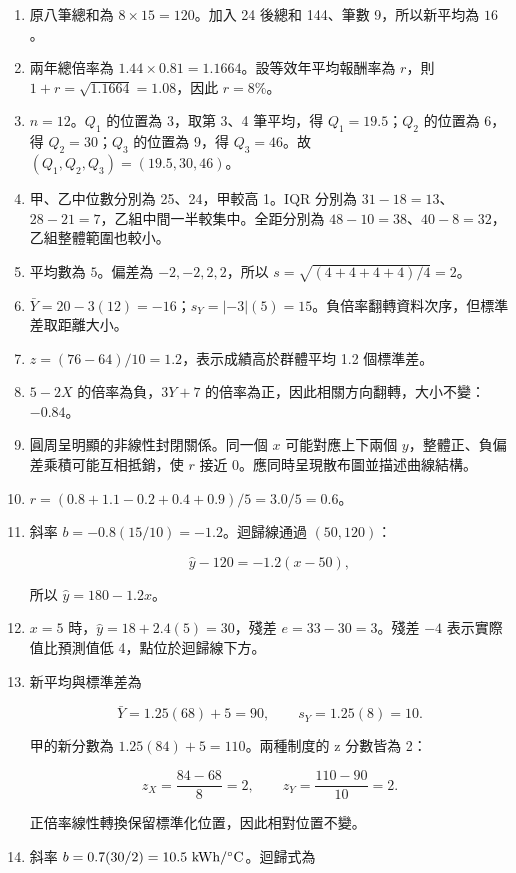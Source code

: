 \documentclass[11pt,a4paper]{article}
\begin{document}
\begin{enumerate}
\def\labelenumi{\arabic{enumi}.}
\item
  原八筆總和為 \(8\times15=120\)。加入 24 後總和 144、筆數 9，所以新平均為 \(\boxed{16}\)。
\item
  兩年總倍率為 \(1.44\times0.81=1.1664\)。設等效年平均報酬率為 \(r\)，則 \(1+r=\sqrt{1.1664}=1.08\)，因此 \(\boxed{r=8\%}\)。
\item
  \(n=12\)。\(Q_1\) 的位置為 3，取第 3、4 筆平均，得 \(Q_1=19.5\)；\(Q_2\) 的位置為 6，得 \(Q_2=30\)；\(Q_3\) 的位置為 9，得 \(Q_3=46\)。故 \(\boxed{(Q_1,Q_2,Q_3)=(19.5,30,46)}\)。
\item
  甲、乙中位數分別為 25、24，甲較高 1。IQR 分別為 \(31-18=13\)、\(28-21=7\)，乙組中間一半較集中。全距分別為 \(48-10=38\)、\(40-8=32\)，乙組整體範圍也較小。
\item
  平均數為 \(5\)。偏差為 \(-2,-2,2,2\)，所以 \(s=\sqrt{(4+4+4+4)/4}=\boxed{2}\)。
\item
  \(\bar Y=20-3(12)=\boxed{-16}\)；\(s_Y=|-3|(5)=\boxed{15}\)。負倍率翻轉資料次序，但標準差取距離大小。
\item
  \(z=(76-64)/10=\boxed{1.2}\)，表示成績高於群體平均 1.2 個標準差。
\item
  \(5-2X\) 的倍率為負，\(3Y+7\) 的倍率為正，因此相關方向翻轉，大小不變：\(\boxed{-0.84}\)。
\item
  圓周呈明顯的非線性封閉關係。同一個 \(x\) 可能對應上下兩個 \(y\)，整體正、負偏差乘積可能互相抵銷，使 \(r\) 接近 0。應同時呈現散布圖並描述曲線結構。
\item
  \(r=(0.8+1.1-0.2+0.4+0.9)/5=3.0/5=\boxed{0.6}\)。
\item
  斜率 \(b=-0.8(15/10)=-1.2\)。迴歸線通過 \((50,120)\)：

  \[
  \hat y-120=-1.2(x-50),
  \]

  所以 \(\boxed{\hat y=180-1.2x}\)。
\item
  \(x=5\) 時，\(\hat y=18+2.4(5)=30\)，殘差 \(e=33-30=\boxed{3}\)。殘差 \(-4\) 表示實際值比預測值低 4，點位於迴歸線下方。
\item
  新平均與標準差為

  \[
  \bar Y=1.25(68)+5=90,
  \qquad
  s_Y=1.25(8)=10.
  \]

  甲的新分數為 \(1.25(84)+5=110\)。兩種制度的 z 分數皆為 2：

  \[
  z_X=\frac{84-68}{8}=2,
  \qquad
  z_Y=\frac{110-90}{10}=2.
  \]

  正倍率線性轉換保留標準化位置，因此相對位置不變。
\item
  斜率 \(b=0.7(30/2)=10.5\ \text{kWh}/^\circ\text C\)。迴歸式為


\end{enumerate}
\end{document}

